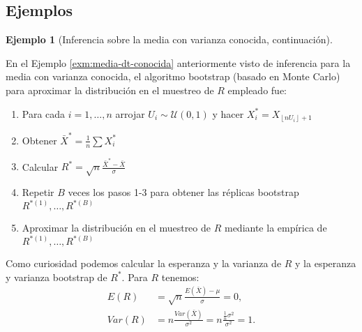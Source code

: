 \documentclass[
]{book}
\theoremstyle{break}
\theoremstyle{definition}
\theoremstyle{definition}
\newtheorem{example}{Ejemplo}[chapter]
\theoremstyle{definition}
\theoremstyle{definition}
\theoremstyle{remark}
\begin{document}
\hypertarget{ejemplos}{%
\subsection{Ejemplos}\label{ejemplos}}

\begin{example}[Inferencia sobre la media con varianza conocida, continuación]
\protect\hypertarget{exm:media-dt-conocida-perturbando}{}{\label{exm:media-dt-conocida-perturbando} \iffalse (Inferencia sobre la media con varianza conocida, continuación) \fi{} }
\end{example}

En el Ejemplo \ref{exm:media-dt-conocida} anteriormente visto de inferencia para la media con
varianza conocida, el algoritmo bootstrap (basado en Monte Carlo) para
aproximar la distribución en el muestreo de \(R\) empleado fue:

\begin{enumerate}
\def\labelenumi{\arabic{enumi}.}
\item
  Para cada \(i=1,\ldots ,n\) arrojar \(U_i\sim \mathcal{U}\left( 0,1 \right)\) y
  hacer \(X_i^{\ast}=X_{\left\lfloor nU_i\right\rfloor +1}\)
\item
  Obtener \(\bar{X}^{\ast}=\frac{1}{n}\sum X_i^{\ast}\)
\item
  Calcular
  \(R^{\ast}=\sqrt{n}\frac{\bar{X}^{\ast}-\bar{X}}{ \sigma }\)
\item
  Repetir \(B\) veces los pasos 1-3 para obtener las réplicas bootstrap
  \(R^{\ast (1)}, \ldots, R^{\ast (B)}\)
\item
  Aproximar la distribución en el muestreo de \(R\) mediante la empírica
  de \(R^{\ast (1)}, \ldots, R^{\ast (B)}\)
\end{enumerate}

Como curiosidad podemos calcular la esperanza y la varianza de \(R\) y la
esperanza y varianza bootstrap de \(R^{\ast}\). Para \(R\) tenemos:
\[\begin{aligned}
E\left( R \right) &=\sqrt{n}\frac{E\left( \bar{X} \right) -\mu }{\sigma }
=0, \\
Var\left( R \right) &=n\frac{Var\left( \bar{X} \right)}{\sigma^2}=n
\frac{\frac{1}{n}\sigma^2}{\sigma^2}=1.
\end{aligned}\]
\end{document}
